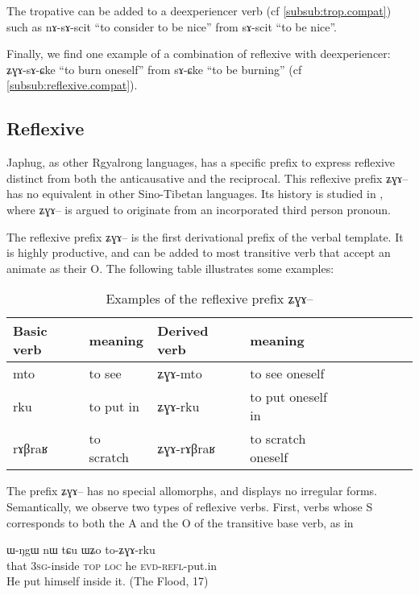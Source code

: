 \documentclass[oldfontcommands,oneside,a4paper,11pt]{memoir}
\newcommand{\ipa}[1]{{\phon #1}} %
\newcommand{\evd}{\textsc{evd}}
\newcommand{\loc}{\textsc{loc}}
\newcommand{\refl}{\textsc{refl}}
\newcommand{\sg}{\textsc{sg}}
\newcommand{\topic}{\textsc{top}}
\begin{document}
The tropative can be added to a deexperiencer verb (cf \ref{subsub:trop.compat}) such as \ipa{nɤ-sɤ-scit} ``to consider to be nice'' from \ipa{sɤ-scit} ``to be nice''.

Finally, we find one example of a combination of reflexive with deexperiencer: \ipa{ʑɣɤ-sɤ-ɕke} ``to burn oneself'' from \ipa{sɤ-ɕke} ``to be burning'' (cf \ref{subsub:reflexive.compat}).



\subsection{Reflexive} \label{sub:reflexive}
Japhug, as other Rgyalrong languages, has a specific prefix to express reflexive distinct from both the anticausative and the reciprocal. This reflexive prefix  \ipa{ʑɣɤ}-- has no equivalent in other Sino-Tibetan languages. Its history is studied in \citet{jacques10refl}, where  \ipa{ʑɣɤ}-- is argued to originate from an incorporated  third person pronoun.


The reflexive prefix \ipa{ʑɣɤ}-- is the first derivational prefix of the verbal template. It is highly productive, and can be added to most transitive verb that accept an animate as their O. The following table illustrates some examples:

\begin{table}[H]
\caption{Examples of the reflexive prefix \ipa{ʑɣɤ}-- }\label{tab:refl}
\begin{tabular}{lllllllll} \toprule
 
Basic verb	&meaning	&Derived verb	&meaning\\
\midrule
\ipa{mto}  &	  to see	& \ipa{ʑɣɤ-mto}  &	  to see oneself \\ 
\ipa{rku}  &	to put in	& \ipa{ʑɣɤ-rku}  &	  to put oneself in \\
\ipa{rɤβraʁ}  &	  to scratch	& \ipa{ʑɣɤ-rɤβraʁ}  &	  to scratch oneself \\  
\bottomrule
\end{tabular}
\end{table}
The prefix \ipa{ʑɣɤ}-- has no special allomorphs, and displays no irregular forms. Semantically, we observe two types of reflexive verbs. First, verbs whose S corresponds to both the A and the O of the transitive base verb, as in 
   \begin{exe}
\ex
\gll \ipa{nɯnɯ} 	\ipa{ɯ-ŋgɯ} 	\ipa{nɯ} 	\ipa{tɕu} 	\ipa{ɯʑo} 	\ipa{to-ʑɣɤ-rku}    \\
that 3\sg{}-inside \topic{} \loc{} he \evd{}-\refl{}-put.in    \\
  \glt He put himself inside it. (The Flood, 17)
   \end{exe}
 
\end{document}
